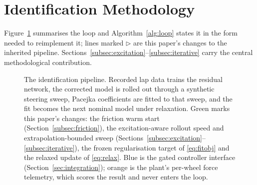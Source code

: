 \section{Identification Methodology}
\label{sec:method}

Figure~\ref{fig:pipeline} summarises the loop and Algorithm~\ref{alg:loop}
states it in the form needed to reimplement it; lines marked $\triangleright$
are this paper's changes to the inherited pipeline.
Sections~\ref{subsec:excitation}--\ref{subsec:iterative} carry the central
methodological contribution.

\begin{figure}[t]
\centering
\resizebox{0.98\textwidth}{!}{}
\caption{The identification pipeline. Recorded lap data trains the residual
network, the corrected model is rolled out through a synthetic steering sweep,
Pacejka coefficients are fitted to that sweep, and the fit becomes the next
nominal model under relaxation. Green marks this paper's changes: the friction
warm start (Section~\ref{subsec:friction}), the excitation-aware rollout speed
and extrapolation-bounded sweep
(Sections~\ref{subsec:excitation}--\ref{subsec:iterative}), the frozen
regularisation target of \eqref{eq:fitobj} and the relaxed update of
\eqref{eq:relax}. Blue is the gated controller interface
(Section~\ref{sec:integration}); orange is the plant's per-wheel force
telemetry, which scores the result and never enters the loop.}
\label{fig:pipeline}
\end{figure}

